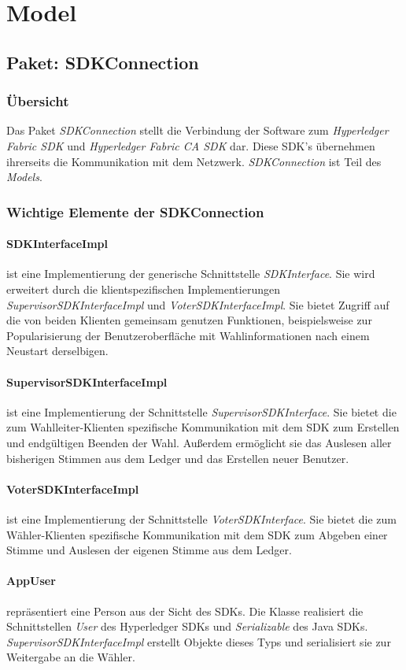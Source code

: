 \documentclass[parskip=full]{scrartcl}
\begin{document}
	\newpage
	\section{Model}
	\subsection{Paket: SDKConnection}
	\subsubsection{Übersicht}
	Das Paket \textit{SDKConnection} stellt die Verbindung der Software zum \textit{Hyperledger Fabric SDK} und \textit{Hyperledger Fabric CA SDK} dar. Diese SDK's übernehmen ihrerseits die Kommunikation mit dem Netzwerk. \textit{SDKConnection} ist Teil des \textit{Models}.
	\subsubsection{Wichtige Elemente der SDKConnection}
	\paragraph{SDKInterfaceImpl} ist eine Implementierung der generische Schnittstelle \textit{SDKInterface}. Sie wird erweitert durch die klientspezifischen Implementierungen \textit{SupervisorSDKInterfaceImpl} und \textit{VoterSDKInterfaceImpl}. Sie bietet Zugriff auf die von beiden Klienten gemeinsam genutzen Funktionen, beispielsweise zur Popularisierung der Benutzeroberfläche mit Wahlinformationen nach einem Neustart derselbigen.
	\paragraph{SupervisorSDKInterfaceImpl} ist eine Implementierung der Schnittstelle \textit{SupervisorSDKInterface}. Sie bietet die zum Wahlleiter-Klienten spezifische Kommunikation mit dem SDK zum Erstellen und endgültigen Beenden der Wahl. Außerdem ermöglicht sie das Auslesen aller bisherigen Stimmen aus dem Ledger und das Erstellen neuer Benutzer.
	\paragraph{VoterSDKInterfaceImpl} ist eine Implementierung der Schnittstelle \textit{VoterSDKInterface}. Sie bietet die zum Wähler-Klienten spezifische Kommunikation mit dem SDK zum Abgeben einer Stimme und Auslesen der eigenen Stimme aus dem Ledger.
	\paragraph{AppUser} repräsentiert eine Person aus der Sicht des SDKs. Die Klasse realisiert die Schnittstellen \textit{User} des Hyperledger SDKs und \textit{Serializable} des Java SDKs. \textit{SupervisorSDKInterfaceImpl} erstellt Objekte dieses Typs und serialisiert sie zur Weitergabe an die Wähler.
\end{document}
